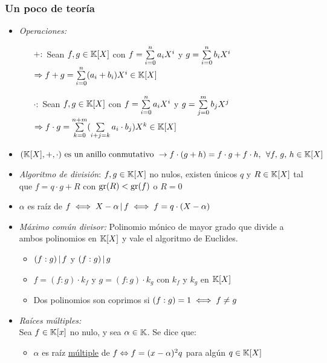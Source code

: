\newcommand{\polGen}[1]{\sumatoria{i=0}{n} #1_i X^i}
\newcommand{\mult}[1]{\text{mult}(#1)}


\subsubsection*{Un poco de teoría}

\begin{itemize}
	\item \textit{Operaciones: }
	      \begin{itemize}
		      \item[$+:$] Sean $f,g \in \mathbb K[X]$ con $f = \polGen{a}$ y $g = \polGen{b}$\\
		            $\Rightarrow f + g = \sum\limits_{i=0}^{n} (a_i + b_i) X^i \in \mathbb K[X]$
		      \item[$\cdot:$] Sean $f,g \in \mathbb K[X]$ con $f = \polGen{a}$ y $g = \sum\limits_{j=0}^{m} b_j X^j$\\
		            $\Rightarrow f \cdot g = \sum\limits_{k=0}^{n+m} (\sum\limits_{i+j=k}^{} a_i \cdot b_j) X^k \in \mathbb K[X]$
	      \end{itemize}
	\item $(\mathbb K[X],+,\cdot) \text{ es un anillo conmutativo } \to f\cdot(g+h) = f\cdot g + f\cdot h,\, \;\forall f,\,g,\,h \in \mathbb K[X]$

	\item \textit{Algoritmo de división}: $f,g \in \mathbb K[X]$ no nulos, existen únicos $q$ y $R \in \mathbb K[X]$ tal que $f = q\cdot g + R$
      con $\text{gr}(R) < \text{gr}(f)$ o $R = 0$

	\item $\alpha$ es raíz de $f \iff X - \alpha \, | \, f \iff f = q \cdot ( X - \alpha)$

	\item \textit{Máximo común divisor: } Polinomio mónico de mayor grado que divide a ambos polinomios en $\mathbb K[X]$
	      y vale el algoritmo de Euclides.
	      \begin{itemize}
		      \item $(f:g) \, | \, f$ y $(f:g) \, | \, g$

		      \item $f = (f:g)\cdot k_f$ y $g = (f:g)\cdot k_g$ con $k_f$ y $k_g$ en $\mathbb K[X]$

		      \item Dos polinomios son coprimos si $(f:g) = 1 \iff f \neq g$
	      \end{itemize}

	\item \textit{Raíces múltiples: }\\
	      Sea $f \in \mathbb K[x]$ no nulo, y sea $\alpha \in \mathbb K$. Se dice que:
	      \begin{itemize}
		      \item $\alpha$ es raíz \underline{múltiple} de $f \Leftrightarrow f = (x - \alpha)^2 q$ para algún $q \in \mathbb K[X]$


\end{itemize}
\end{itemize}
